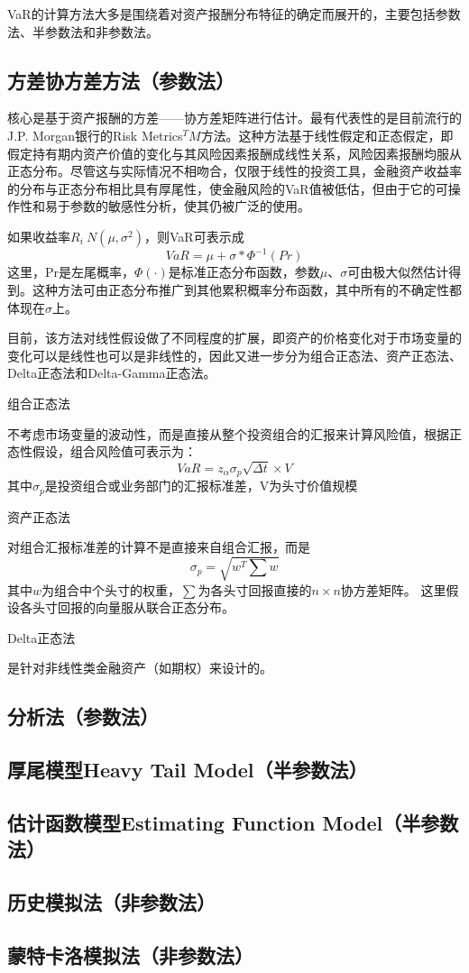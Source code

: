 \documentclass[UTF8]{ctexart}
\newcommand \qd[1] {\begin{qds} {#1} \end{qds}}
\begin{document}
VaR的计算方法大多是围绕着对资产报酬分布特征的确定而展开的，主要包括参数法、半参数法和非参数法。

\subsection{方差协方差方法（参数法）}
核心是基于资产报酬的方差——协方差矩阵进行估计。最有代表性的是目前流行的J.P. Morgan银行的Risk Metrics$^TM$方法。这种方法基于线性假定和正态假定，即假定持有期内资产价值的变化与其风险因素报酬成线性关系，风险因素报酬均服从正态分布。尽管这与实际情况不相吻合，仅限于线性的投资工具，金融资产收益率的分布与正态分布相比具有厚尾性，使金融风险的VaR值被低估，但由于它的可操作性和易于参数的敏感性分析，使其仍被广泛的使用。

如果收益率$R_i~N(\mu,\sigma^2)$，则VaR可表示成$$VaR=\mu+\sigma*\Phi^{-1}(Pr)$$这里，Pr是左尾概率，$\Phi(·)$是标准正态分布函数，参数$\mu、\sigma$可由极大似然估计得到。这种方法可由正态分布推广到其他累积概率分布函数，其中所有的不确定性都体现在$\sigma$上。

目前，该方法对线性假设做了不同程度的扩展，即资产的价格变化对于市场变量的变化可以是线性也可以是非线性的，因此又进一步分为组合正态法、资产正态法、Delta正态法和Delta-Gamma正态法。

\qd{组合正态法}不考虑市场变量的波动性，而是直接从整个投资组合的汇报来计算风险值，根据正态性假设，组合风险值可表示为：
$$VaR=z_\alpha \sigma_p \sqrt{\Delta t} \times V$$
其中$\sigma_p$是投资组合或业务部门的汇报标准差，V为头寸价值规模

\qd{资产正态法}对组合汇报标准差的计算不是直接来自组合汇报，而是
$$\sigma_p=\sqrt{w^T\sum w}$$
其中$w$为组合中个头寸的权重，$\sum$为各头寸回报直接的$n \times n$协方差矩阵。
这里假设各头寸回报的向量服从联合正态分布。

\qd{Delta正态法}是针对非线性类金融资产（如期权）来设计的。

\subsection{分析法（参数法）}

\subsection{厚尾模型Heavy Tail Model（半参数法）}

\subsection{估计函数模型Estimating Function Model（半参数法）}

\subsection{历史模拟法（非参数法）}

\subsection{蒙特卡洛模拟法（非参数法）}
\end{document}
